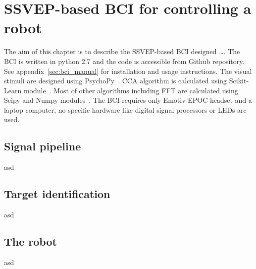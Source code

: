 
\chapter{SSVEP-based BCI for controlling a robot}
\label{sec:SSVEP_BCI}

The aim of this chapter is to describe the \gls{SSVEP}-based \gls{BCI} designed \dots. The \gls{BCI} is written in python 2.7 and the code is accessible from Github repository. See appendix~\ref{sec:bci_manual} for installation and usage instructions. The visual stimuli are designed using PsychoPy~\cite{psychopy}. \gls{CCA} algorithm is calculated using Scikit-Learn module~\cite{scikit-learn}. Most of other algorithms including \gls{FFT} are calculated using Scipy and Numpy modules~\cite{scipy}. The \gls{BCI} requires only Emotiv EPOC headset and a laptop computer, no specific hardware like digital signal processors or \glspl{LED} are used.

\section{Signal pipeline}
asd
\section{Target identification}
asd
\section{The robot}
asd